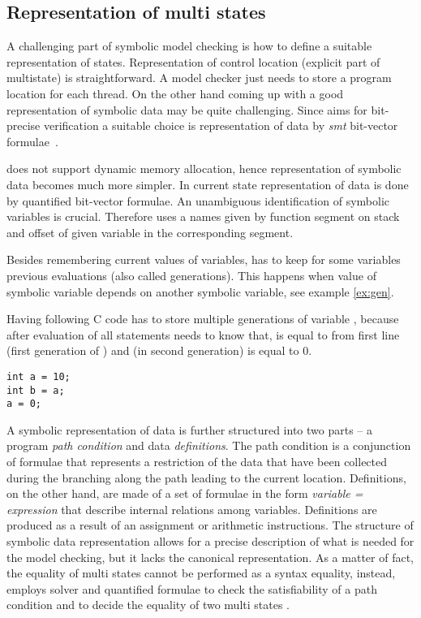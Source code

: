 \subsection{Representation of multi states} \label{sec:multistates}

A challenging part of symbolic model checking is how to define a suitable
representation of states. Representation of control location (explicit part of
multistate) is straightforward. A model checker just needs to store
a program location for each thread. On the other hand coming up with a good
representation of symbolic data may be quite challenging. Since \DIVINE aims
for bit-precise verification a suitable choice is representation of data
by \emph{smt} bit-vector formulae~\cite{Bauch14}.


\SymDIVINE does not support dynamic memory allocation, hence representation
of symbolic data becomes much more simpler. In current state representation of
data is done by quantified bit-vector \SMT formulae. An unambiguous identification
of symbolic variables is crucial. Therefore \SymDIVINE uses a names given by function
segment on stack and offset of given variable in the corresponding segment.

Besides remembering current values of variables, \SymDIVINE has to keep for
some variables previous evaluations (also called generations). This happens when
value of symbolic variable depends on another symbolic variable, see example
\ref{ex:gen}.

\begin{example}\label{ex:gen}
Having following C code \SymDIVINE has to store multiple generations of variable
, because after evaluation of all statements \SymDIVINE needs to know
that,  is equal to  from first line (first generation of
) and  (in second generation) is equal to $0$.

\begin{verbatim}
int a = 10;
int b = a;
a = 0;
\end{verbatim}

\end{example}

A symbolic representation of data is further structured into two parts -- a
program \emph{path condition} and data \emph{definitions}. The path condition is a
conjunction of formulae that represents a restriction of the data that have been
collected during the branching along the path leading to the current location.
Definitions, on the other hand, are made of a set of formulae in the form
\emph{variable = expression} that describe internal relations among variables.
Definitions are produced as a result of an assignment or arithmetic
instructions. The structure of symbolic data representation allows for a
precise description of what is needed for the model checking, but it lacks the
canonical representation. As a matter of fact, the equality of multi states
cannot be performed as a syntax equality, instead, \SymDIVINE employs \SMT
solver and quantified formulae to check the satisfiability of a path condition
and to decide the equality of two multi states \cite{Mrazek16}.

